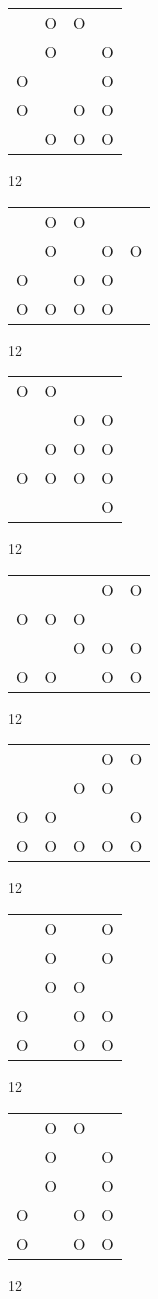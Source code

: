 \begin{tabular}{|m{0.2cm}m{0.2cm}m{0.2cm}m{0.2cm}|}\hline
 &O&O& \\
 &O& &O\\
O& & &O\\
O& &O&O\\
 &O&O&O\\
\hline\end{tabular}12
\begin{tabular}{|m{0.2cm}m{0.2cm}m{0.2cm}m{0.2cm}m{0.2cm}|}\hline
 &O&O& & \\
 &O& &O&O\\
O& &O&O& \\
O&O&O&O& \\
\hline\end{tabular}12
\begin{tabular}{|m{0.2cm}m{0.2cm}m{0.2cm}m{0.2cm}|}\hline
O&O& & \\
 & &O&O\\
 &O&O&O\\
O&O&O&O\\
 & & &O\\
\hline\end{tabular}12
\begin{tabular}{|m{0.2cm}m{0.2cm}m{0.2cm}m{0.2cm}m{0.2cm}|}\hline
 & & &O&O\\
O&O&O& & \\
 & &O&O&O\\
O&O& &O&O\\
\hline\end{tabular}12
\begin{tabular}{|m{0.2cm}m{0.2cm}m{0.2cm}m{0.2cm}m{0.2cm}|}\hline
 & & &O&O\\
 & &O&O& \\
O&O& & &O\\
O&O&O&O&O\\
\hline\end{tabular}12
\begin{tabular}{|m{0.2cm}m{0.2cm}m{0.2cm}m{0.2cm}|}\hline
 &O& &O\\
 &O& &O\\
 &O&O& \\
O& &O&O\\
O& &O&O\\
\hline\end{tabular}12
\begin{tabular}{|m{0.2cm}m{0.2cm}m{0.2cm}m{0.2cm}|}\hline
 &O&O& \\
 &O& &O\\
 &O& &O\\
O& &O&O\\
O& &O&O\\
\hline\end{tabular}12
